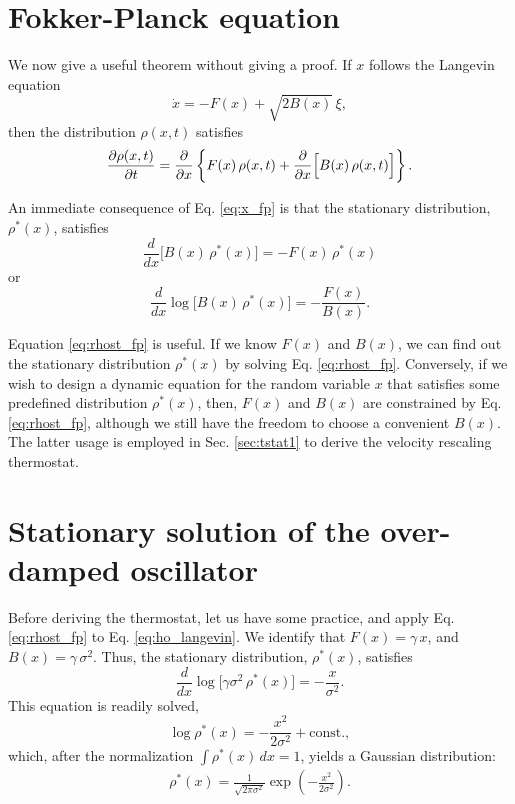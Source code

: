 \documentclass[11pt]{article}
\begin{document}
\section{Fokker-Planck equation}



We now give a useful theorem without giving a proof.
%
If $x$ follows the Langevin equation
\begin{equation}
  \dot x = -F(x) + \sqrt{ 2 B(x) } \, \xi,
  \label{eq:x_langevin}
\end{equation}
then the distribution $\rho(x, t)$ satisfies
\begin{equation}
\frac { \partial \rho(x, t) } { \partial t }
=
\frac { \partial } { \partial x }
\left\{
  F(x) \, \rho(x, t)
  +
  \frac { \partial  } { \partial x } \Bigl[ B(x) \, \rho(x, t) \Bigr]
\right\}.
\label{eq:x_fp}
\end{equation}

An immediate consequence of Eq. \eqref{eq:x_fp} is that
the stationary distribution, $\rho^*(x)$, satisfies
\begin{equation*}
  \frac { d } { d x } \bigl[ B(x) \, \rho^*(x) \bigr]
=
  - F(x) \, \rho^*(x)
\end{equation*}
or
\begin{equation}
  \frac { d } { d x } \log\bigl[ B(x) \, \rho^*(x) \bigr]
=
  - \frac{ F(x) }{ B(x) }.
\label{eq:rhost_fp}
\end{equation}

Equation \eqref{eq:rhost_fp} is useful.
%
If we know $F(x)$ and $B(x)$,
we can find out the stationary distribution $\rho^*(x)$
by solving Eq. \eqref{eq:rhost_fp}.
%
Conversely,
if we wish to design a dynamic equation for the random variable $x$
that satisfies some predefined distribution $\rho^*(x)$,
%
then, $F(x)$ and $B(x)$ are constrained by Eq. \eqref{eq:rhost_fp},
although we still have the freedom to choose a convenient $B(x)$.
%
The latter usage is employed in Sec. \ref{sec:tstat1} to derive
the velocity rescaling thermostat.



\section{\label{sec:rhost}
Stationary solution of the over-damped oscillator}



Before deriving the thermostat,
let us have some practice,
and apply Eq. \eqref{eq:rhost_fp} to Eq. \eqref{eq:ho_langevin}.
%
We identify that
$F(x) = \gamma \, x$,
and
$B(x) = \gamma \, \sigma^2$.
%
Thus, the stationary distribution, $\rho^*(x)$, satisfies
\[
  \frac { d } { d x } \log\bigl[ \gamma \sigma^2 \, \rho^*(x) \bigr]
=
  - \frac{ x }{ \sigma^2 }.
\]
This equation is readily solved,
\[
  \log \rho^*(x)
=
  - \frac{ x^2 }{ 2 \sigma^2 }
  + \mathrm{const.},
\]
which,
after the normalization $\int \rho^*(x) \, dx = 1$,
yields a Gaussian distribution:
\begin{align}
\rho^*(x)
=
\frac{ 1 } { \sqrt{ 2 \pi \sigma^2 } }
\exp\left(
  -\frac{ x^2 } { 2 \sigma^2 }
\right).
\label{eq:ho_rhost}
\end{align}
\end{document}
